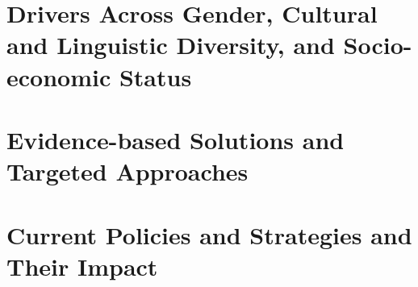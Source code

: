 \lipsum[3]

\section{Drivers Across Gender, Cultural and Linguistic Diversity, and Socio-economic Status}
\label{sec:tor:drivers}

\lipsum[4]

\section{Evidence-based Solutions and Targeted Approaches}
\label{sec:tor:solutions}

\lipsum[1]

\section{Current Policies and Strategies and Their Impact}
\label{sec:tor:policies}

\lipsum[2]
